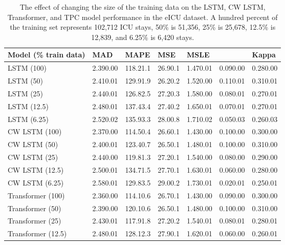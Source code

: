 \documentclass[sigconf]{acmart}
\begin{document}
\begin{table*}[ht]
    \caption{The effect of changing the size of the training data on the LSTM, CW LSTM, Transformer, and TPC model performance in the eICU dataset. A hundred percent of the training set represents 102,712 ICU stays, 50\% is 51,356, 25\% is 25,678, 12.5\% is 12,839, and 6.25\% is 6,420 stays.}
    \label{tab:extraablationresults}
    \centering
    \begin{tabular}{p{2.9cm}|p{1.3cm}p{1.3cm}p{1.3cm}p{1.3cm}p{1.3cm}p{1.3cm}}
    \toprule
        \textbf{Model (\% train data)} & \textbf{MAD} & \textbf{MAPE} & \textbf{MSE} & \textbf{MSLE} & \boldmath{} & \textbf{Kappa} \\
    \midrule
        LSTM (100) & {2.390.00} & {118.21.1} & {26.90.1} & {1.470.01} & {0.090.00} & {0.280.00} \\
        LSTM (50) & {2.410.01} & {129.91.9} & {26.20.2} & {1.520.00} & {0.110.01} & {0.310.01} \\
        LSTM (25) & {2.440.01} & {126.82.5} & {27.20.3} & {1.580.00} & {0.080.01} & {0.270.01} \\
        LSTM (12.5) & {2.480.01} & {137.43.4} & {27.40.2} & {1.650.01} & {0.070.01} & {0.270.01} \\
        LSTM (6.25) & {2.520.02} & {135.93.3} & {28.00.8} & {1.710.02} & {0.050.03} & {0.260.03} \\
    \midrule
        CW LSTM (100) & {2.370.00} & {114.50.4} & {26.60.1} & {1.430.00} & {0.100.00} & {0.300.00} \\
        CW LSTM (50) & {2.400.01} & {123.40.7} & {26.50.1} & {1.480.01} & {0.100.00} & {0.310.00} \\
        CW LSTM (25) & {2.440.00} & {119.81.3} & {27.20.1} & {1.540.00} & {0.080.00} & {0.290.00} \\
        CW LSTM (12.5) & {2.500.01} & {134.71.5} & {27.70.1} & {1.630.01} & {0.060.00} & {0.280.00} \\
        CW LSTM (6.25) & {2.580.01} & {129.83.5} & {29.00.2} & {1.730.01} & {0.020.01} & {0.250.01} \\
    \midrule
        Transformer (100) & {2.360.00} & {114.10.6} & {26.70.1} & {1.430.00} & {0.090.00} & {0.300.00} \\
        Transformer (50) & {2.390.00} & {120.10.6} & {26.50.1} & {1.480.00} & {0.100.00} & {0.310.00} \\
        Transformer (25) & {2.430.01} & {117.91.8} & {27.20.2} & {1.540.01} & {0.080.01} & {0.280.01} \\
        Transformer (12.5) & {2.480.01} & {128.12.3} & {27.90.1} & {1.620.01} & {0.060.00} & {0.260.01} \\

\end{tabular}
\end{table*}
\end{document}
